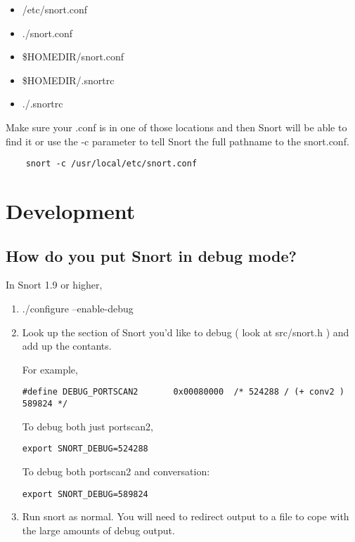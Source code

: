 \documentclass{article}
\begin{document}
\begin{itemize}
  \item /etc/snort.conf
  \item ./snort.conf
  \item \$HOMEDIR/snort.conf
  \item \$HOMEDIR/.snortrc
  \item ./.snortrc
\end{itemize}

Make sure your .conf is in one of those locations and then Snort will be able
to find it or use the -c parameter to tell Snort the full pathname to the
snort.conf.
\begin{verbatim}
    snort -c /usr/local/etc/snort.conf
\end{verbatim}
   
\section{Development}   
  

\subsection{How do you put Snort in debug mode? }

In Snort 1.9 or higher,

\begin{enumerate}

\item ./configure --enable-debug
\item Look up the section of Snort you'd like to debug ( look at src/snort.h ) and add up the contants.

For example, 
\begin{verbatim}#define DEBUG_PORTSCAN2       0x00080000  /* 524288 / (+ conv2 ) 589824 */\end{verbatim}

To debug both just portscan2, 
\begin{verbatim}export SNORT_DEBUG=524288\end{verbatim}

To debug both portscan2 and conversation: 
\begin{verbatim}export SNORT_DEBUG=589824\end{verbatim}

\item Run snort as normal.  You will need to redirect output to a file
   to cope with the large amounts of debug output.
\end{enumerate}
\end{document}

